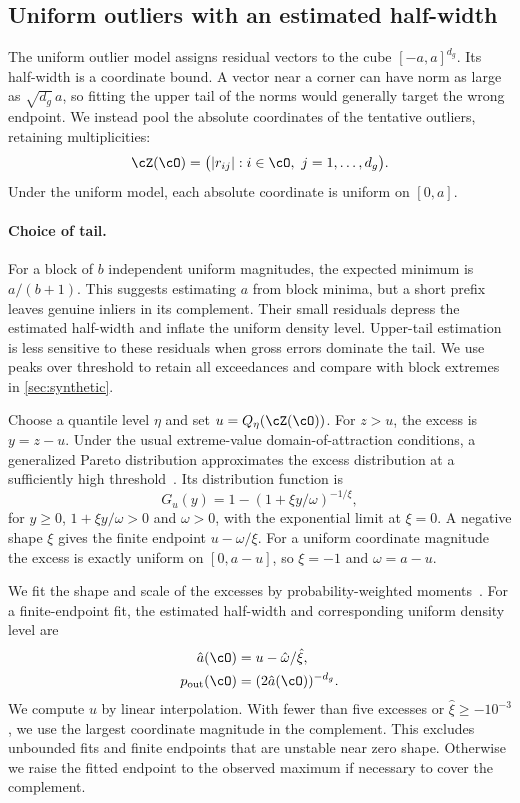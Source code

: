 \documentclass[10pt,twocolumn,letterpaper]{article}
\newcommand{\pout}{p_{\mathrm{out}}}
\newcommand{\ahat}{\hat a}
\newcommand{\toutliers}{tentative outliers\xspace}
\begin{document}
\subsection{Uniform outliers with an estimated half-width}
\label{sec:outlier}\label{sec:why-maxima}

The uniform outlier model assigns residual vectors to the cube
$[-a,a]^{d_g}$. Its half-width is a coordinate bound. A vector near a
corner can have norm as large as $\sqrt{d_g}\,a$, so fitting the upper
tail of the norms would generally target the wrong endpoint. We instead
pool the absolute coordinates of the \toutliers, retaining
multiplicities:
\begin{equation}
 \cZ(\cO)=\bigl(|r_{ij}|:i\in\cO,\ j=1,\ldots,d_g\bigr).
 \label{eq:pooled}
\end{equation}
Under the uniform model, each absolute coordinate is uniform on $[0,a]$.

\paragraph{Choice of tail.}
For a block of $b$ independent uniform magnitudes, the expected
minimum is $a/(b+1)$. This suggests estimating $a$ from block minima,
but a short prefix leaves genuine inliers in its complement. Their
small residuals depress the estimated half-width and inflate the
uniform density level. Upper-tail estimation is less sensitive to
these residuals when gross errors dominate the tail. We use peaks
over threshold to retain all exceedances and compare with block
extremes in \cref{sec:synthetic}.

Choose a quantile level $\eta$ and set $u=Q_\eta(\cZ(\cO))$.
For $z>u$, the excess is $y=z-u$. Under the usual extreme-value
domain-of-attraction conditions, a generalized Pareto distribution
approximates the excess distribution at a sufficiently high
threshold~\cite{Balkema1974,Pickands1975}. Its distribution function is
\begin{equation}
 G_u(y)=1-(1+\xi y/\omega)^{-1/\xi},
 \label{eq:gpd}
\end{equation}
for $y\geq0$, $1+\xi y/\omega>0$ and $\omega>0$, with the
exponential limit at $\xi=0$. A negative shape $\xi$ gives the finite
endpoint $u-\omega/\xi$. For a uniform coordinate magnitude the excess is
exactly uniform on $[0,a-u]$, so $\xi=-1$ and $\omega=a-u$.

We fit the shape and scale of the excesses by probability-weighted
moments~\cite{Hosking1987}. For a finite-endpoint fit, the estimated
half-width and corresponding uniform density level are
\begin{align}
 \ahat(\cO)&=u-\hat\omega/\hat\xi,  \label{eq:endpoint}\\
 \pout(\cO)&=(2\ahat(\cO))^{-d_g}.     \label{eq:pout}
\end{align}
We compute $u$ by linear interpolation. With fewer than five excesses
or $\hat\xi\geq-10^{-3}$, we use the largest coordinate magnitude in
the complement. This excludes unbounded fits and finite endpoints that
are unstable near zero shape. Otherwise we raise the fitted endpoint
to the observed maximum if necessary to cover the complement.
\end{document}
